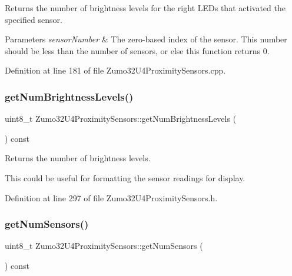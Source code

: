 Returns the number of brightness levels for the right L\+E\+Ds that activated the specified sensor. 


\begin{DoxyParams}{Parameters}
{\em sensor\+Number} & The zero-\/based index of the sensor. This number should be less than the number of sensors, or else this function returns 0. \\
\hline
\end{DoxyParams}


Definition at line 181 of file Zumo32\+U4\+Proximity\+Sensors.\+cpp.

\mbox{\label{class_zumo32_u4_proximity_sensors_ab6cf32a103b2eafb16ad051ca499db48}} 
\subsubsection{\texorpdfstring{get\+Num\+Brightness\+Levels()}{getNumBrightnessLevels()}}
{\footnotesize\ttfamily uint8\+\_\+t Zumo32\+U4\+Proximity\+Sensors\+::get\+Num\+Brightness\+Levels (\begin{DoxyParamCaption}{ }\end{DoxyParamCaption}) const\hspace{0.3cm}{\ttfamily [inline]}}



Returns the number of brightness levels. 

This could be useful for formatting the sensor readings for display. 

Definition at line 297 of file Zumo32\+U4\+Proximity\+Sensors.\+h.

\mbox{\label{class_zumo32_u4_proximity_sensors_abf645921ec976cf1b657fccc50b123a1}} 
\subsubsection{\texorpdfstring{get\+Num\+Sensors()}{getNumSensors()}}
{\footnotesize\ttfamily uint8\+\_\+t Zumo32\+U4\+Proximity\+Sensors\+::get\+Num\+Sensors (\begin{DoxyParamCaption}{ }\end{DoxyParamCaption}) const\hspace{0.3cm}{\ttfamily [inline]}}




